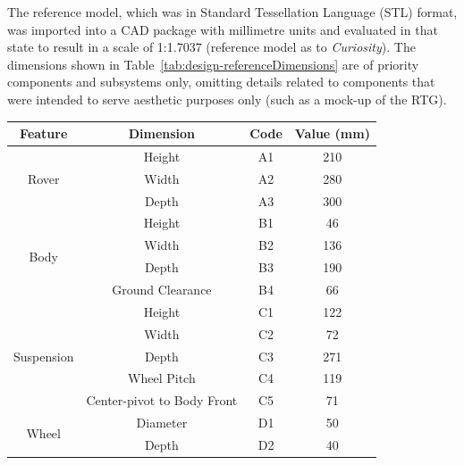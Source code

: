       The reference model, which was in Standard Tessellation Language (STL) format, was imported into a CAD package with millimetre units and evaluated in that state to result in a scale of 1:1.7037 (reference model as to \textit{Curiosity}). The dimensions shown in Table~\ref{tab:design-referenceDimensions} are of priority components and subsystems only, omitting details related to components that were intended to serve aesthetic purposes only (such as a mock-up of the RTG).
      
      \begin{table}[H]
      \centering
      \begin{tabular}{@{}cccc@{}}
      \toprule
      \textbf{Feature}            & \textbf{Dimension}            & \textbf{Code} & \textbf{Value (mm)} \\ \midrule
      \multirow{3}{*}{Rover}      & Height                        & A1   & 210   \\
                                  & Width                         & A2   & 280   \\
                                  & Depth                         & A3   & 300   \\ \midrule
      \multirow{4}{*}{Body}       & Height                        & B1   & 46    \\
                                  & Width                         & B2   & 136   \\
                                  & Depth                         & B3   & 190   \\
                                  & Ground Clearance              & B4   & 66    \\ \midrule
      \multirow{5}{*}{Suspension} & Height                        & C1   & 122   \\
                                  & Width                         & C2   & 72    \\
                                  & Depth                         & C3   & 271   \\
                                  & Wheel Pitch                   & C4   & 119   \\
                                  & Center-pivot to Body Front    & C5   & 71    \\ \midrule
      \multirow{2}{*}{Wheel}      & Diameter                      & D1   & 50    \\
                                  & Depth                         & D2   & 40    \\ \midrule

\end{tabular}
\end{table}
